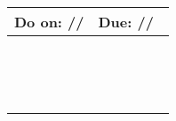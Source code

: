 \documentclass[10pt]{article}
\newcommand{\dater}{\hspace{.4in}/\hspace{.4in}/\hspace{.4in}}
\begin{document}
\begin{tabular*}{\textwidth}{@{\extracolsep{\fill}}lr}
Do on: \dater{} & Due: \dater{}~\\
\hline 
~\\
~\\
~\\
\hline 
\end{tabular*}
\end{document}
